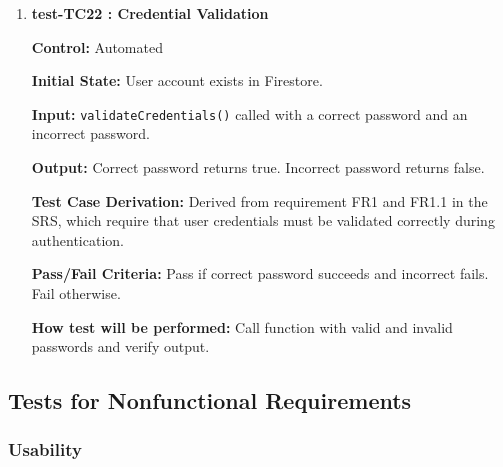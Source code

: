 \documentclass[12pt, titlepage]{article}
\begin{document}
\begin{enumerate}
  \textbf{Control:} Automated

  \textbf{Initial State:} System not yet initialized.

  \textbf{Input:} \texttt{initializeSystem()} called.

  \textbf{Output:} Success message logged to console. No errors thrown.

  \textbf{Test Case Derivation:} Derived from requirement FR1 in the SRS, which implies that the system must initialize correctly to support user authentication and access to core functionality.

  \textbf{Pass/Fail Criteria:} Pass if initialization completes without errors. Fail otherwise.

  \textbf{How test will be performed:} Call initialization function and verify no errors occur.


  \vspace{0.5em}

  \item \textbf{test-TC22 : Credential Validation}

  \textbf{Control:} Automated

  \textbf{Initial State:} User account exists in Firestore.

  \textbf{Input:} \texttt{validateCredentials()} called with a correct password and an incorrect password.

  \textbf{Output:} Correct password returns true. Incorrect password returns false.

  \textbf{Test Case Derivation:} Derived from requirement FR1 and FR1.1 in the SRS, which require that user credentials must be validated correctly during authentication.

  \textbf{Pass/Fail Criteria:} Pass if correct password succeeds and incorrect fails. Fail otherwise.

  \textbf{How test will be performed:} Call function with valid and invalid passwords and verify output.
	
\end{enumerate}


\subsection{Tests for Nonfunctional Requirements}
\subsubsection{Usability}
\end{document}
